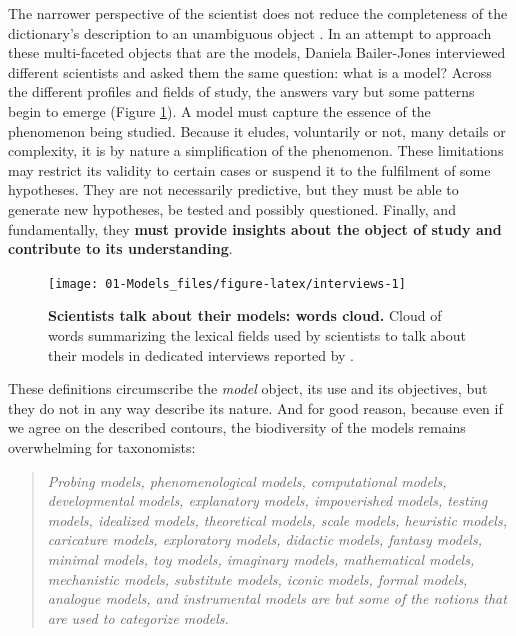 \documentclass[a4paper,12pt,twoside,onecolumn,openright,final,oldfontcommands]{memoir}
\begin{document}
The narrower perspective of the scientist does not reduce the
completeness of the dictionary's description to an unambiguous object
\citep{bailer2002scientists}. In an attempt to approach these
multi-faceted objects that are the models, Daniela Bailer-Jones
interviewed different scientists and asked them the same question: what
is a model? Across the different profiles and fields of study, the
answers vary but some patterns begin to emerge (Figure
\ref{fig:interviews}). A model must capture the essence of the
phenomenon being studied. Because it eludes, voluntarily or not, many
details or complexity, it is by nature a simplification of the
phenomenon. These limitations may restrict its validity to certain cases
or suspend it to the fulfilment of some hypotheses. They are not
necessarily predictive, but they must be able to generate new
hypotheses, be tested and possibly questioned. Finally, and
fundamentally, they \textbf{must provide insights about the object of
study and contribute to its understanding}.

\begin{figure}

{\centering \texttt{[image: 01-Models\_files/figure-latex/interviews-1]} 

}

\caption[Scientists talk about their models: words cloud.]{\textbf{Scientists talk about their models:
words cloud.} Cloud of words summarizing the lexical fields used by
scientists to talk about their models in dedicated interviews reported
by \citet{bailer2002scientists}.}\label{fig:interviews}
\end{figure}






These definitions circumscribe the \emph{model} object, its use and its
objectives, but they do not in any way describe its nature. And for good
reason, because even if we agree on the described contours, the
biodiversity of the models remains overwhelming for taxonomists:

\begin{quote}
\emph{Probing models, phenomenological models, computational models,
developmental models, explanatory models, impoverished models, testing
models, idealized models, theoretical models, scale models, heuristic
models, caricature models, exploratory models, didactic models, fantasy
models, minimal models, toy models, imaginary models, mathematical
models, mechanistic models, substitute models, iconic models, formal
models, analogue models, and instrumental models are but some of the
notions that are used to categorize models.}\\
\citep{frigg2020models}
\end{quote}
\end{document}
